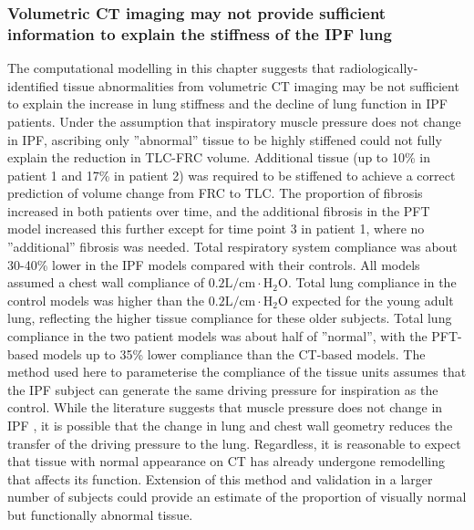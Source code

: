 \subsubsection{Volumetric CT imaging may not provide sufficient information to explain the stiffness of the IPF lung}
The computational modelling in this chapter suggests that radiologically-identified tissue abnormalities from volumetric CT imaging may be not sufficient to explain the increase in lung stiffness and the decline of lung function in IPF patients. Under the assumption that inspiratory muscle pressure does not change in IPF, ascribing only ''abnormal'' tissue to be highly stiffened could not fully explain the reduction in TLC-FRC volume. Additional tissue (up to 10\% in patient 1 and 17\% in patient 2) was required to be stiffened to achieve a correct prediction of volume change from FRC to TLC. The proportion of fibrosis increased in both patients over time, and the additional fibrosis in the PFT model increased this further except for time point 3 in patient 1, where no ''additional'' fibrosis was needed. Total respiratory system compliance was about 30-40\% lower in the IPF models compared with their controls. All models assumed a chest wall compliance of $\mathrm{0.2 L/cm \cdot H_2O}$. Total lung compliance in the control models was higher than the $\mathrm{0.2 L/cm \cdot H_2O}$ expected for the young adult lung, reflecting the higher tissue compliance for these older subjects. Total lung compliance in the two patient models was about half of ''normal'', with the PFT-based models up to 35\% lower compliance than the CT-based models. The method used here to parameterise the compliance of the tissue units assumes that the IPF subject can generate the same driving pressure for inspiration as the control. While the literature suggests that muscle pressure does not change in IPF \citep{de1980inspiratory}, it is possible that the change in lung and chest wall geometry reduces the transfer of the driving pressure to the lung. Regardless, it is reasonable to expect that tissue with normal appearance on CT has already undergone remodelling that affects its function. Extension of this method and validation in a larger number of subjects could provide an estimate of the proportion of visually normal but functionally abnormal tissue. 

